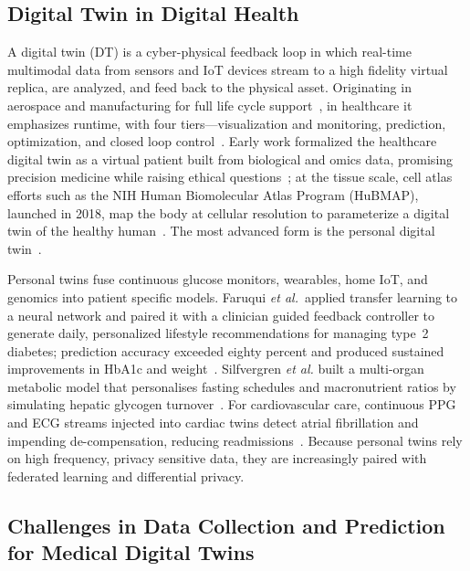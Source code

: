 \documentclass[journal]{IEEEtran}
\begin{document}
\subsection{Digital Twin in Digital Health}

A digital twin (DT) is a cyber-physical feedback loop in which real-time multimodal data from sensors and IoT devices stream to a high fidelity virtual replica, are analyzed, and feed back to the physical asset. Originating in aerospace and manufacturing for full life cycle support~\cite{Tao2018}, in healthcare it emphasizes runtime, with four tiers---visualization and monitoring, prediction, optimization, and closed loop control~\cite{NIST2021,sun2023digitaltwin}. Early work formalized the healthcare digital twin as a virtual patient built from biological and omics data, promising precision medicine while raising ethical questions~\cite{Bruynseels2018DigitalTwins}; at the tissue scale, cell atlas efforts such as the NIH Human Biomolecular Atlas Program (HuBMAP), launched in 2018, map the body at cellular resolution to parameterize a digital twin of the healthy human~\cite{HuBMAP2019}. The most advanced form is the personal digital twin~\cite{deKerckhove2021}.

Personal twins fuse continuous glucose monitors, wearables, home IoT, and genomics into patient specific models. Faruqui \emph{et al.}\ applied transfer learning to a neural network and paired it with a clinician guided feedback controller to generate daily, personalized lifestyle recommendations for managing type 2 diabetes; prediction accuracy exceeded eighty percent and produced sustained improvements in HbA1c and weight~\cite{Faruqui2024}. Silfvergren \emph{et al.} built a multi-organ metabolic model that personalises fasting schedules and macronutrient ratios by simulating hepatic glycogen turnover \cite{Silfvergren2022}. For cardiovascular care, continuous PPG and ECG streams injected into cardiac twins detect atrial fibrillation and impending de-compensation, reducing readmissions \cite{Bayoumy2021,Williams2023}. Because personal twins rely on high frequency, privacy sensitive data, they are increasingly paired with federated learning and differential privacy.



\subsection{Challenges in Data Collection and Prediction for Medical Digital Twins}
\end{document}
